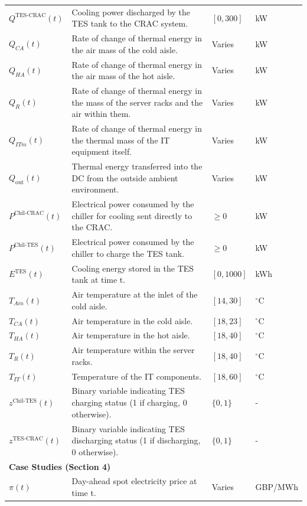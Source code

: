 \documentclass[lettersize,journal]{IEEEtran}
\begin{document}
{{\begin{longtable}{p{} p{} p{} p{}}
$Q^{\mathrm{TES}\text{-}\mathrm{CRAC}}(t)$ & Cooling power discharged by the TES tank to the CRAC system. & $[0, 300]$ &kW \\
$Q_{CA}(t)$ & Rate of change of thermal energy in the air mass of the cold aisle. & Varies &kW \\
$Q_{HA}(t)$ & Rate of change of thermal energy in the air mass of the hot aisle. & Varies &kW \\
$Q_{R}(t)$ & Rate of change of thermal energy in the mass of the server racks and the air within them. & Varies &kW \\
$Q_{ITm}(t)$ & Rate of change of thermal energy in the thermal mass of the IT equipment itself. & Varies &kW \\
$Q_{\mathrm{out}}(t)$ & Thermal energy transferred into the DC from the outside ambient environment. & Varies &kW \\
$P^{\mathrm{Chil}\text{-}\mathrm{CRAC}}(t)$ & Electrical power consumed by the chiller for cooling sent directly to the CRAC. & $\geq 0$ &kW \\
$P^{\mathrm{Chil}\text{-}\mathrm{TES}}(t)$ & Electrical power consumed by the chiller to charge the TES tank. & $\geq 0$ &kW \\
$E^{\mathrm{TES}}(t)$ & Cooling energy stored in the TES tank at time t. & $[0, 1000]$ &kWh \\
$T_{Ain}(t)$ & Air temperature at the inlet of the cold aisle. & $[14, 30]$ & $^{\circ}$C \\
$T_{CA}(t)$ & Air temperature in the cold aisle. & $[18, 23]$ & $^{\circ}$C \\
$T_{HA}(t)$ & Air temperature in the hot aisle. & $[18, 40]$ & $^{\circ}$C \\
$T_{R}(t)$ & Air temperature within the server racks. & $[18, 40]$ & $^{\circ}$C \\
$T_{IT}(t)$ & Temperature of the IT components. & $[18, 60]$ & $^{\circ}$C \\
$z^{\mathrm{Chil}\text{-}\mathrm{TES}}(t)$ & Binary variable indicating TES charging status (1 if charging, 0 otherwise). & $\{0, 1\}$ & - \\
$z^{\mathrm{TES}\text{-}\mathrm{CRAC}}(t)$ & Binary variable indicating TES discharging status (1 if discharging, 0 otherwise). & $\{0, 1\}$ & - \\
\midrule
\multicolumn{4}{l}{\textbf{Case Studies (Section 4)}} \\
\midrule
$\pi(t)$ & Day-ahead spot electricity price at time t. & Varies & GBP/MWh \\

\end{longtable}}}
\end{document}
